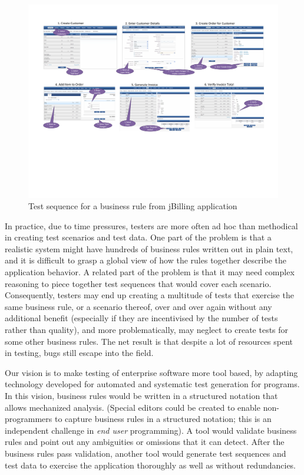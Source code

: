 \begin{figure}
\centering
\includegraphics[trim=0 200 0 50,clip,width=7.5in]{figs/jbilling-flow}
\caption{Test sequence for a business rule from jBilling application}
\label{fig:jbilling-flow}
\end{figure}

In practice, due to time pressures, testers are more often ad hoc than methodical in creating test 
scenarios and test data.  One part of the problem is that a realistic system might have hundreds of 
business rules written out in plain text, and it is difficult to grasp a global view of how the rules 
together describe the application behavior.  A related part of the problem is that it may need complex 
reasoning to piece together test sequences that would cover each scenario. Consequently, testers may end 
up creating a multitude of tests that exercise the same business rule, or a scenario thereof, over and over 
again without any additional benefit (especially if they are incentivised by the number of tests rather than 
quality), and more problematically, may neglect to create tests for some other business rules.  The net 
result is that despite a lot of resources spent in testing, bugs still escape into the field.

Our vision is to make testing of enterprise software more tool based, by adapting technology developed 
for automated and systematic test generation for programs.   In this vision, business rules would be 
written in a structured notation that allows mechanized analysis. 
(Special editors could be created to enable non-programmers to capture business rules in a structured notation; 
this is an independent challenge in \textit{end user} programming).  A tool would validate business rules 
and point out any ambiguities or omissions that it can detect.  After the business rules pass validation, 
another tool would generate test sequences and test data to exercise the application thoroughly as well as
without redundancies.

